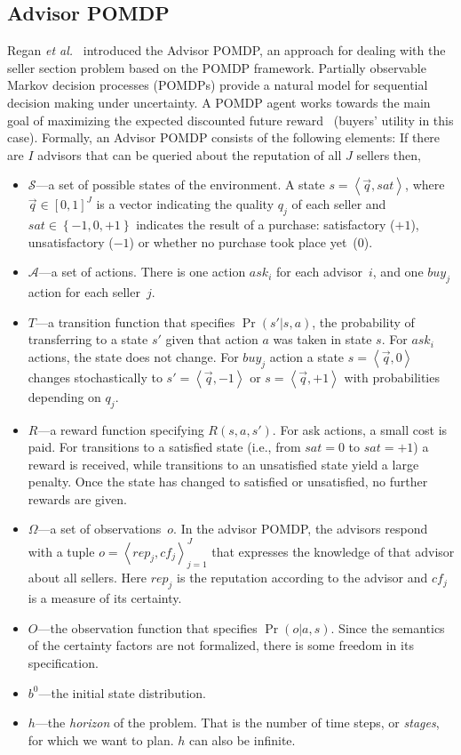 \documentclass{aamas2014}
\begin{document}
\subsection{Advisor POMDP}
Regan \textit{et al.}~\cite{regan2005advisor} introduced the Advisor POMDP, an approach for dealing with the
seller section problem based on the POMDP framework. Partially observable Markov decision processes (POMDPs) provide a natural model for sequential decision making under uncertainty. A POMDP agent works towards the main goal of maximizing the expected discounted future reward~\cite{kaelbling1998planning} (buyers' utility in this case).  Formally, an Advisor POMDP consists of the following elements: If there are $I$ advisors that can be queried about the reputation of all $J$ sellers then,
\begin{itemize}
\item $\mathcal{S}$---a set of possible states of the environment. A state $s=\left\langle \vec{q},sat\right\rangle $, where $\vec{q}\in[0,1]^{J}$ is a vector indicating the quality $q_j$ of each seller and $sat\in\left\{ -1,0,+1\right\} $ indicates the result of a purchase: satisfactory ($+1$), unsatisfactory ($-1$) or whether no purchase took place yet~(0).
\item $\mathcal{A}$---a set of actions. There is one action $ask_{i}$ for each advisor~$i$, and one $buy_{j}$ action for each seller~$j$.
\item $T$---a transition function that specifies $\Pr(s'|s,a)$, the probability of transferring to a state $s'$ given that action $a$ was taken in state $s$. For $ask_i$ actions, the state does not change. For $buy_{j}$ action a state $s=\left\langle \vec{q},0\right\rangle $ changes stochastically to $s'=\left\langle \vec{q},-1\right\rangle $ or $s=\left\langle \vec{q},+1\right\rangle $ with probabilities depending on ${q}_{j}$.
\item $R$---a reward function specifying $R(s,a,s')$. For ask actions, a small cost is paid. For transitions to a satisfied state (i.e., from $sat=0$ to $sat=+1$) a reward is received, while transitions to an unsatisfied state yield a large penalty. Once the state has changed to satisfied or unsatisfied, no further rewards are given.
\item $\Omega$---a set of observations~$o$. In the advisor POMDP, the advisors respond with a tuple $o=\left\langle rep_{j},cf_{j}\right\rangle _{j=1}^{J}$ that expresses the knowledge of that advisor about all sellers. Here $rep_{j}$ is the reputation according to the advisor and $cf_{j}$ is a measure of its certainty.
\item $O$---the observation function that specifies $\Pr(o|a,s)$. Since the semantics of the certainty factors are not formalized, there is some freedom in its specification.
\item $b^{0}$---the initial state distribution.
\item $h$---the \emph{horizon} of the problem. That is the number of time steps, or \emph{stages}, for which we want to plan. $h$ can also be infinite.
\end{itemize}
\end{document}
